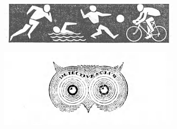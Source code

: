 \begin{figure}[ht]
    \centering

    \begin{minipage}[5cm]{0.3\textwidth}
        \centering
        \begin{subfigure}{3.5cm}
            \includegraphics[width=\linewidth]{Images/logo FPs/drawings/EXP-1972-12-02-a-i0308.jpg}
            
        \end{subfigure}

        \begin{subfigure}{3.5cm}
            \includegraphics[width=\linewidth]{Images/logo FPs/drawings/GDL-1951-10-24-a-i0014.jpg}
            
        \end{subfigure}


\end{minipage}
\end{figure}
